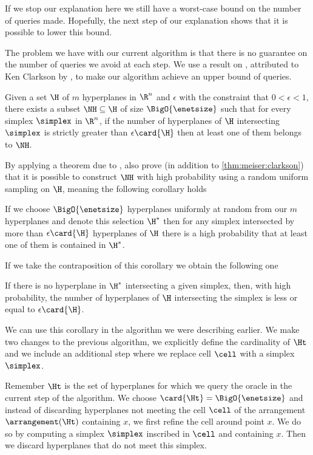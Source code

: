 If we stop our explanation here we still have a worst-case 
bound on the number of queries made. Hopefully, the next step of our
explanation shows that it is possible to lower this bound.

The problem we have with our current algorithm is that there is no guarantee
on the number of queries we avoid at each step.
We use a result on \enets, attributed to Ken Clarkson by
\citet{burgisser:1997}, to make our algorithm achieve an upper bound
of  queries.
\begin{theorem}[Clarkson]\label{thm:meiser:clarkson}
Given a set $\H$ of $m$ hyperplanes in $\R^n$ and $\epsilon$ with the
constraint that $0 < \epsilon < 1$, there exists a subset $\NH \subseteq \H$ of
size $\BigO{\enetsize}$ such that for every simplex $\simplex$ in $\R^n$, if the
number of hyperplanes of $\H$ intersecting $\simplex$ is strictly greater than
$\epsilon \card{\H}$ then at least one of them belongs to $\NH$.
\end{theorem}

By applying a theorem due to \citet*{haussler:1987},
\citet{burgisser:1997} also prove (in addition to \ref{thm:meiser:clarkson}) that it is possible to
construct $\NH$ with high probability using a random uniform sampling on $\H$,
meaning the following corollary holds
\begin{corollary}
If we choose $\BigO{\enetsize}$ hyperplanes uniformly at
random from our $m$ hyperplanes and denote this selection $\H^{*}$ then for
any simplex intersected by more than $\epsilon \card{\H}$ hyperplanes of $\H$
there is a high probability that at least one of them is contained in $\H^{*}$.
\end{corollary}

If we take the contraposition of this corollary we obtain the following one
\begin{corollary}
If there is no hyperplane in $\H^{*}$ intersecting a given simplex, then, with
high probability, the number of hyperplanes of $\H$ intersecting the simplex
is less or equal to $\epsilon \card{\H}$.
\end{corollary}

We can use this corollary in the algorithm we were describing earlier. We
make two changes to the previous algorithm, we explicitly define the
cardinality of $\Ht$ and we include an additional step where we replace cell
$\cell$ with a simplex $\simplex$.

Remember \(\Ht\) is the set of hyperplanes for which we query the oracle
in the current step of the algorithm. We choose \(\card{\Ht} = \BigO{\enetsize}\) and
instead of discarding hyperplanes not meeting the cell $\cell$ of the
arrangement $\arrangement(\Ht)$ containing $x$, we first refine the cell around
point $x$. We do so by computing a simplex $\simplex$ inscribed in $\cell$ and
containing \(x\). Then we discard hyperplanes that do not meet this simplex.

